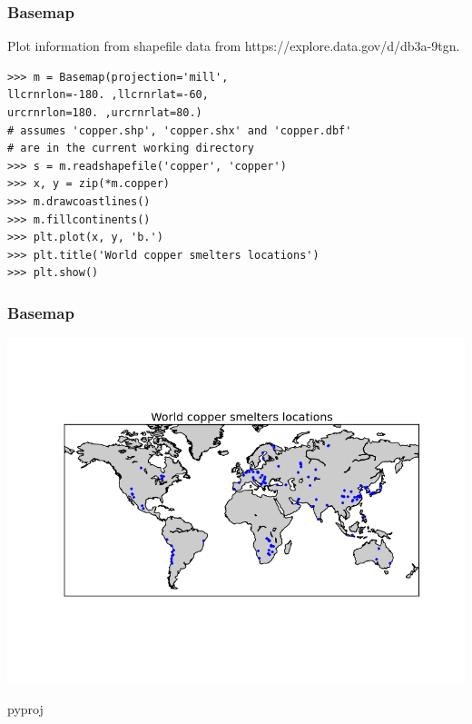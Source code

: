 \begin{frame}[fragile]
\frametitle{Basemap}
Plot information from shapefile 
data from https://explore.data.gov/d/db3a-9tgn.
\begin{myColorBox}{0.9}{}
\begin{verbatim}
>>> m = Basemap(projection='mill',
llcrnrlon=-180. ,llcrnrlat=-60,
urcrnrlon=180. ,urcrnrlat=80.)
# assumes 'copper.shp', 'copper.shx' and 'copper.dbf'
# are in the current working directory 
>>> s = m.readshapefile('copper', 'copper')
>>> x, y = zip(*m.copper)
>>> m.drawcoastlines()
>>> m.fillcontinents()
>>> plt.plot(x, y, 'b.')
>>> plt.title('World copper smelters locations')
>>> plt.show()
\end{verbatim}
\end{myColorBox}
\end{frame}

\begin{frame}[fragile]
\frametitle{Basemap}
\begin{center}
      \includegraphics[width=1.0\textwidth]{pix/basemap_example_4}
\end{center}
\end{frame}

\begin{frame}
\begin{center}
\Huge{pyproj}
\end{center}
\end{frame}

